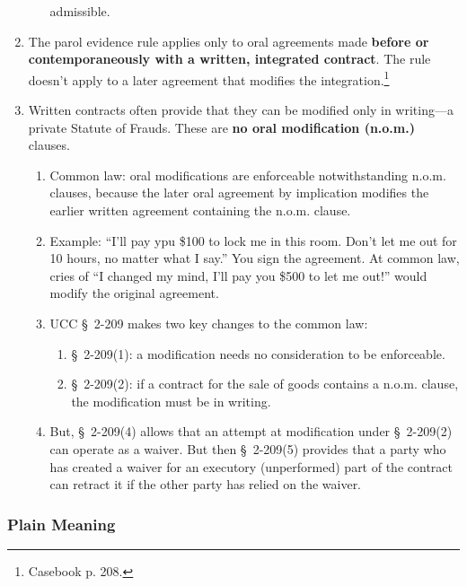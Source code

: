 \begin{enumerate}
\begin{enumerate}
        admissible.
    \end{enumerate}
    \item The parol evidence rule applies only to oral agreements made 
    \textbf{before or contemporaneously with a written, integrated contract}. 
    The rule doesn't apply to a later agreement that modifies the 
    integration.\footnote{Casebook p. 208.}
    \item Written contracts often provide that they can be modified only in 
    writing---a private Statute of Frauds. These are \textbf{no oral 
    modification (n.o.m.)} clauses.
    \begin{enumerate}
        \item Common law: oral modifications are enforceable notwithstanding 
        n.o.m. clauses, because the later oral agreement by implication modifies 
        the earlier written agreement containing the n.o.m. clause.
        \item Example: ``I'll pay ypu \$100 to lock me in this room. Don't let me 
        out for 10 hours, no matter what I say.'' You sign the agreement. At 
        common law, cries of ``I changed my mind, I'll pay you \$500 to let me 
        out!'' would modify the original agreement.
        \item UCC \S\ 2-209 makes two key changes to the common law:
        \begin{enumerate}
            \item \S\ 2-209(1): a modification needs no consideration to be 
            enforceable.
            \item \S\ 2-209(2): if a contract for the sale of goods contains a 
            n.o.m. clause, the modification must be in writing.
        \end{enumerate}
        \item But, \S\ 2-209(4) allows that an attempt at modification under \S\ 
        2-209(2) can operate as a waiver. But then \S\ 2-209(5) provides that a 
        party who has created a waiver for an executory (unperformed) part of the 
        contract can retract it if the other party has relied on the waiver.
    \end{enumerate}
\end{enumerate}

\subsubsection{Plain Meaning}

